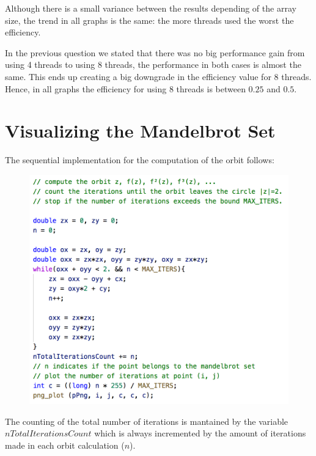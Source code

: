 \documentclass[unicode,11pt,a4paper,oneside,numbers=endperiod,openany]{scrartcl}
\begin{document}
\begin{enumerate}
        Although there is a small variance between the results depending of the array size, the trend in all graphs is the same: the more threads used the worst the efficiency.

        In the previous question we stated that there was no big performance gain from using 4 threads to using 8 threads, the performance in both cases is almost the same.
        This ends up creating a big downgrade in the efficiency value for 8 threads.
        Hence, in all graphs the efficiency for using 8 threads is between $0.25$ and $0.5$.
\end{enumerate}


\section{Visualizing the Mandelbrot Set }

    The sequential implementation for the computation of the orbit follows: 
    
    \begin{figure}[H]
        \centering
        \includegraphics[width=0.9\linewidth]{mandel}
    \end{figure}


    The counting of the total number of iterations is mantained by the variable $nTotalIterationsCount$ which is always incremented by the amount of iterations made in each orbit calculation ($n$).
\end{document}
